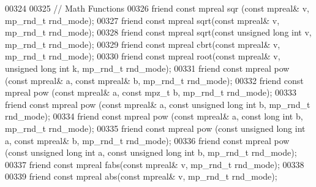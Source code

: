 \begin{DoxyCode}
00324 
00325     \textcolor{comment}{// Math Functions}
00326     \textcolor{keyword}{friend} \textcolor{keyword}{const} mpreal sqr (\textcolor{keyword}{const} mpreal& v, mp\_rnd\_t rnd\_mode);
00327     \textcolor{keyword}{friend} \textcolor{keyword}{const} mpreal sqrt(\textcolor{keyword}{const} mpreal& v, mp\_rnd\_t rnd\_mode);
00328     \textcolor{keyword}{friend} \textcolor{keyword}{const} mpreal sqrt(\textcolor{keyword}{const} \textcolor{keywordtype}{unsigned} \textcolor{keywordtype}{long} \textcolor{keywordtype}{int} v, mp\_rnd\_t rnd\_mode);
00329     \textcolor{keyword}{friend} \textcolor{keyword}{const} mpreal cbrt(\textcolor{keyword}{const} mpreal& v, mp\_rnd\_t rnd\_mode);
00330     \textcolor{keyword}{friend} \textcolor{keyword}{const} mpreal root(\textcolor{keyword}{const} mpreal& v, \textcolor{keywordtype}{unsigned} \textcolor{keywordtype}{long} \textcolor{keywordtype}{int} k, mp\_rnd\_t rnd\_mode);
00331     \textcolor{keyword}{friend} \textcolor{keyword}{const} mpreal pow (\textcolor{keyword}{const} mpreal& a, \textcolor{keyword}{const} mpreal& b, mp\_rnd\_t rnd\_mode);
00332     \textcolor{keyword}{friend} \textcolor{keyword}{const} mpreal pow (\textcolor{keyword}{const} mpreal& a, \textcolor{keyword}{const} mpz\_t b, mp\_rnd\_t rnd\_mode);
00333     \textcolor{keyword}{friend} \textcolor{keyword}{const} mpreal pow (\textcolor{keyword}{const} mpreal& a, \textcolor{keyword}{const} \textcolor{keywordtype}{unsigned} \textcolor{keywordtype}{long} \textcolor{keywordtype}{int} b, mp\_rnd\_t rnd\_mode);
00334     \textcolor{keyword}{friend} \textcolor{keyword}{const} mpreal pow (\textcolor{keyword}{const} mpreal& a, \textcolor{keyword}{const} \textcolor{keywordtype}{long} \textcolor{keywordtype}{int} b, mp\_rnd\_t rnd\_mode);
00335     \textcolor{keyword}{friend} \textcolor{keyword}{const} mpreal pow (\textcolor{keyword}{const} \textcolor{keywordtype}{unsigned} \textcolor{keywordtype}{long} \textcolor{keywordtype}{int} a, \textcolor{keyword}{const} mpreal& b, mp\_rnd\_t rnd\_mode);
00336     \textcolor{keyword}{friend} \textcolor{keyword}{const} mpreal pow (\textcolor{keyword}{const} \textcolor{keywordtype}{unsigned} \textcolor{keywordtype}{long} \textcolor{keywordtype}{int} a, \textcolor{keyword}{const} \textcolor{keywordtype}{unsigned} \textcolor{keywordtype}{long} \textcolor{keywordtype}{int} b, mp\_rnd\_t rnd\_mode);
00337     \textcolor{keyword}{friend} \textcolor{keyword}{const} mpreal fabs(\textcolor{keyword}{const} mpreal& v, mp\_rnd\_t rnd\_mode);
00338 
00339     \textcolor{keyword}{friend} \textcolor{keyword}{const} mpreal abs(\textcolor{keyword}{const} mpreal& v, mp\_rnd\_t rnd\_mode);

\end{DoxyCode}
